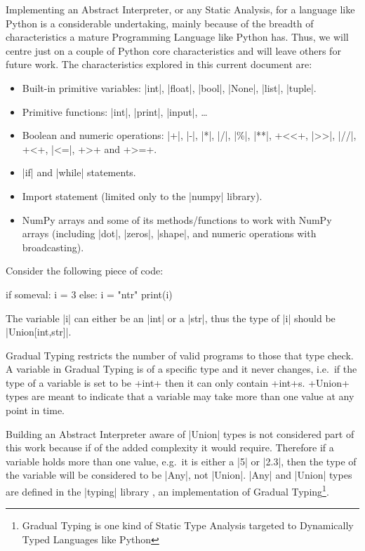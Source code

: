 Implementing an Abstract Interpreter, or any Static Analysis, for a language like Python
is a considerable undertaking, mainly because of the breadth of characteristics a mature
Programming Language like Python has. Thus, we will centre just on a couple of Python core
characteristics and will leave others for future work. The characteristics explored in
this current document are:

\begin{itemize}
\tightlist
\item Built-in primitive variables: \pycode|int|, \pycode|float|, \pycode|bool|,
  \pycode|None|, \pycode|list|, \pycode|tuple|.
\item Primitive functions: \pycode|int|, \pycode|print|, \pycode|input|,
  \ldots{}
\item Boolean and numeric operations: \pycode|+|, \pycode|-|, \pycode|*|, \pycode|/|,
  \pycode|\%|, \pycode|**|, \pycode+<<+, \pycode|>>|, \pycode|//|, \pycode+<+,
  \pycode|<=|, \pycode+>+ and \pycode+>=+.
\item \pycode|if| and \pycode|while| statements.
\item Import statement (limited only to the \pycode|numpy| library).
\item NumPy arrays and some of its methods/functions to work with NumPy arrays (including
  \pycode|dot|, \pycode|zeros|, \pycode|shape|, and numeric operations with broadcasting).
\end{itemize}

Consider the following piece of code:

\begin{pythoncode}
if someval:
  i = 3
else:
  i = "ntr"
print(i)
\end{pythoncode}

The variable \pycode|i| can either be an \pycode|int| or a \pycode|str|, thus the type of
\pycode|i| should be \pycode|Union[int,str]|.

Gradual Typing restricts the number of valid programs to those that type check. A variable
in Gradual Typing is of a specific type and it never changes, i.e.~if the type of a
variable is set to be \pycode+int+ then it can only contain \pycode+int+s. \pycode+Union+
types are meant to indicate that a variable may take more than one value at any point in
time.

Building an Abstract Interpreter aware of \pycode|Union| types is not considered part of
this work because if of the added complexity it would require. Therefore if a variable
holds more than one value, e.g.~it is either a \pycode|5| or \pycode|2.3|, then the type
of the variable will be considered to be \pycode|Any|, not \pycode|Union|. \pycode|Any|
and \pycode|Union| types are defined in the \pycode|typing| library \autocite{pep484}, an
implementation of Gradual Typing\footnote{%
  Gradual Typing is one kind of Static Type Analysis targeted to Dynamically Typed Languages
  like Python}.

